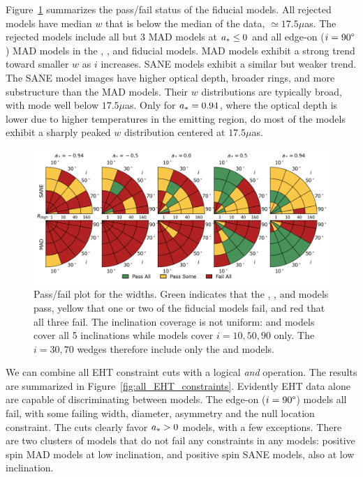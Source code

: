 Figure~\ref{fig:mring_width_salsa} summarizes the \mring  pass/fail status of the fiducial models. All rejected models have median $w$ that is below the median of the data, $ \simeq 17.5\mu$as.  The rejected models include all but 3 MAD models at $a_* \le 0$ and all edge-on ($i = 90\degree$) MAD models in the  \kharma, \bhac, and \hamr fiducial models.  MAD models exhibit a strong trend toward smaller $w$ as $i$ increases.  SANE models exhibit a similar but weaker trend. The SANE model images have  higher optical depth, broader rings, and more substructure than the MAD models.  Their $w$ distributions are typically broad, with mode well below $17.5\mu$as.  Only for $a_* = 0.94$, where the optical depth is lower due to higher temperatures in the emitting region, do most of the models exhibit a sharply peaked $w$ distribution centered at $17.5\mu$as.

\begin{figure}\label{fig:mring_width_salsa}
 \centering
 \includegraphics[width=\textwidth]{./figures/Mring_w_Constraints.png}
  \caption{Pass/fail plot for the \mring widths.  Green indicates that the \kharma, \bhac, and \hamr models pass, yellow that one or two of the fiducial models fail, and red that all three fail.  The inclination coverage is not uniform: \bhac and \kharma models cover all 5 inclinations while \hamr models cover $i = 10, 50, 90$ only.  The $i = 30, 70$ wedges therefore include only the \bhac and \kharma models.}
\end{figure}



We can combine all EHT constraint cuts with a logical {\em and} operation.  The results are summarized in Figure~\ref{fig:all_EHT_constraints}.  Evidently EHT data alone are capable of discriminating between models.   The edge-on ($i = 90\degree$) models all fail, with some failing \mring width, diameter, asymmetry and the null location constraint.  The cuts clearly favor $a_* > 0$ models, with a few exceptions.  There are two clusters of models that do not fail any constraints in any models: positive spin MAD models at low inclination, and positive spin SANE models, also at low inclination.

